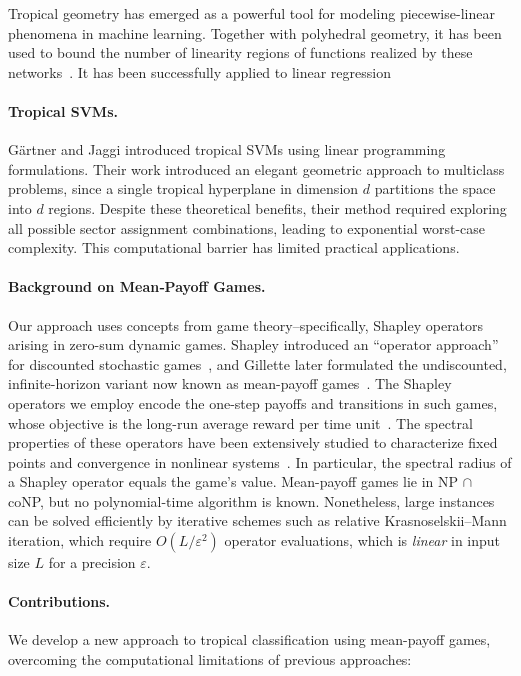 \documentclass{article}
\begin{document}
Tropical geometry has emerged as a powerful tool for modeling piecewise-linear phenomena in machine learning. Together with polyhedral geometry,
it has been used to bound the number of linearity regions of functions realized by these networks~\cite{zhang2018,montufar}.
It has been successfully applied to linear regression \cite{maragos2020,akiangaubertqisaadi}

\paragraph{Tropical SVMs.} Gärtner and Jaggi \cite{gartner2008} introduced tropical SVMs using linear programming formulations. Their work introduced an elegant geometric approach to multiclass problems, since a single tropical hyperplane in dimension $d$ partitions the space into $d$ regions.
Despite these theoretical benefits, their method required exploring all possible sector assignment combinations, leading to exponential worst-case complexity. This computational barrier has limited practical applications.

\paragraph{Background on Mean‐Payoff Games.}
Our approach uses concepts from game theory--specifically, Shapley operators arising in zero-sum dynamic games.
Shapley introduced an ``operator approach'' for discounted stochastic games~\cite{shapley1953}, and Gillette later formulated the undiscounted, infinite-horizon variant now known as mean-payoff games~\cite{gillette1957}.
The Shapley operators we employ encode the one-step payoffs and transitions in such games, whose objective is the long-run average reward per time unit~\cite{zwick1996}. 
The spectral properties of these operators have been extensively studied to characterize fixed points and convergence in nonlinear systems~\cite{kolokoltsov1997,gaubert2004}.
In particular, the spectral radius of a Shapley operator equals the game's value.
Mean-payoff games lie in NP $\cap$ coNP, but no polynomial-time algorithm is known.
Nonetheless, large instances can be solved efficiently by iterative schemes such as relative Krasnoselskii--Mann iteration, which require $O(L/\varepsilon^2)$ operator evaluations, which is \emph{linear} in input size $L$ for a precision $\varepsilon$.

\paragraph{Contributions.} We develop a new approach to tropical classification using mean-payoff games,
overcoming the computational limitations of previous approaches:
\end{document}

